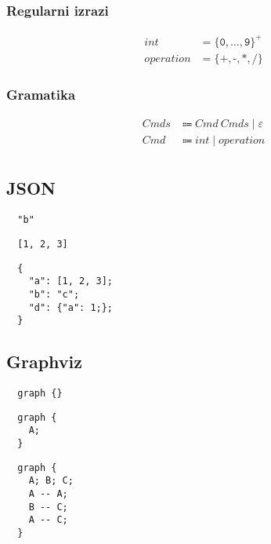 \documentclass{report}
\newcommand{\Null}{\varepsilon}
\newcommand{\Char}[1]{\texttt{#1}}
\newcommand{\Spc}{\ }
\newcommand{\Union}{\mathrel{|}}
\newcommand{\KleenePlus}[1]{#1^+}
\newcommand{\Arrow}{\Coloneq}
\newcommand{\NT}[1]{{#1}}
\newcommand{\T}[1]{{#1}}
\begin{document}
\subsubsection*{Regularni izrazi}
\begin{equation*}
  \begin{aligned}
    \T{int} &= \KleenePlus{\{\Char{0}, \dots, \Char{9}\}}\\
    \T{operation} &= \{\Char{+}, \Char{-}, \Char{*}, \Char{/}\}
  \end{aligned}
\end{equation*}

\subsubsection*{Gramatika}
\begin{equation*}
  \begin{aligned}
    \NT{Cmds} &\Arrow \NT{Cmd} \Spc \NT{Cmds} \Union \Null \\
    \NT{Cmd} &\Arrow \T{int} \Union \T{operation}\\
  \end{aligned}
\end{equation*}

\subsection{JSON}
\begin{verbatim}
  "b"
\end{verbatim}
\begin{verbatim}
  [1, 2, 3]
\end{verbatim}
\begin{verbatim}
  {
    "a": [1, 2, 3];
    "b": "c";
    "d": {"a": 1;};
  }
\end{verbatim}

\subsection{Graphviz}
\begin{verbatim}
  graph {}
\end{verbatim}
\begin{verbatim}
  graph {
    A;
  }
\end{verbatim}
\begin{verbatim}
  graph {
    A; B; C;
    A -- A;
    B -- C;
    A -- C;
  }
\end{verbatim}
\end{document}
